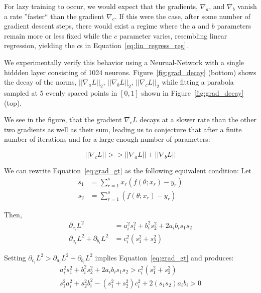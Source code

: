 \documentclass{article}
\begin{document}
For lazy training to occur, we would expect that the gradients, $\nabla_a$, and $\nabla_b$ vanish a rate ''faster`` than the gradient $\nabla_c$. If this were the case, after some number of gradient descent steps, there would exist a regime where the $a$ and $b$ parameters remain more or less fixed while the $c$ parameter varies, resembling linear regression, yielding the $c$s in Equation~\ref{eq:lin_regress_reg}.

We experimentally verify this behavior using a Neurual-Network with a single hiddden layer consisting of 1024 neurons. Figure~\ref{fig:grad_decay} (bottom) shows the decay of the norms, $||\nabla_a L||_2$, $||\nabla_b L||_2$, $||\nabla_c L||_2$ while fitting a parabola sampled at 5 evenly spaced points in $[0, 1]$ shown in Figure~\ref{fig:grad_decay} (top).

We see in the figure, that the gradient $\nabla_c L$ decays at a slower rate than the other two gradients as well as their sum, leading us to conjecture that after a finite number of iterations and for a large enough number of parameters: 

\begin{equation}\label{eq:grad_gt}
    ||\nabla_c L|| >> ||\nabla_a L|| + ||\nabla_b L||
\end{equation}

We can rewrite Equation~\ref{eq:grad_gt} as the following equivalent condition: 
Let
\begin{align}
    s_1 &= \sum_{r=1}^s x_r (f(\theta; x_r) - y_r) \\
    s_2 &= \sum_{r=1}^s (f(\theta; x_r) - y_r)
\end{align}

Then,
\begin{align}
    \partial_{c_i}L^2 &= a_i^2 s_1^2 + b_i^2 s_2^2 + 2 a_i b_i s_1 s_2 \\ 
    \partial_{a_i}L^2 + \partial_{b_i}L^2 &= c_i^2(s_1^2 + s_2^2)
\end{align}

Setting $\partial_{c_i}L^2 > \partial_{a_i}L^2 + \partial_{b_i}L^2$ implies Equation~\ref{eq:grad_gt} and produces:
\begin{align}
    a_i^2 s_1^2 + b_i^2 s_2^2 + 2 a_i b_i s_1 s_2 > c_i^2(s_1^2 + s_2^2) \\
    s_1^2 a_i^2 + s_2^2 b_i^2 - (s_1^2 + s_2^2)c_i^2 + 2(s_1 s_2) a_i b_i > 0
\end{align}

\end{document}
